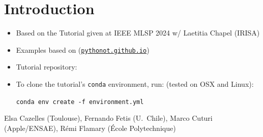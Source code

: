 \documentclass[pdf,aspectratio=169,10pt]{beamer}
\begin{document}
\section{Introduction}
\begin{frame}
\begin{itemize}
    \item Based on the Tutorial  given at IEEE MLSP 2024 w/ Laetitia Chapel (IRISA)
    \item Examples based on  (\href{https://pythonot.github.io/}{\texttt{pythonot.github.io}})
    \item Tutorial repository: 
    \item To clone the tutorial's \texttt{conda} environment, run: (tested on OSX and Linux):
    \vspace{1em}
    \begin{tcolorbox}[colback=blue!5!white,colframe=blue!75!black]
    \centering
  \texttt{conda env create -f environment.yml}
\end{tcolorbox}


\end{itemize}
\vspace{3em}
 Elsa Cazelles (Toulouse), Fernando Fetis (U.~Chile), Marco Cuturi (Apple/ENSAE), Rémi Flamary (École Polytechnique) 

\end{frame}
\end{document}
